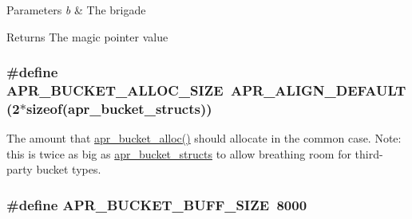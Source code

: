 \begin{DoxyParams}{Parameters}
{\em b} & The brigade \\
\hline
\end{DoxyParams}
\begin{DoxyReturn}{Returns}
The magic pointer value 
\end{DoxyReturn}
\hypertarget{group___a_p_r___util___bucket___brigades_gae3ccf4c383c9e7fea28354cc8e029626}{
\subsubsection[{A\-P\-R\-\_\-\-B\-U\-C\-K\-E\-T\-\_\-\-A\-L\-L\-O\-C\-\_\-\-S\-I\-Z\-E}]{\setlength{\rightskip}{0pt plus 5cm}\#define A\-P\-R\-\_\-\-B\-U\-C\-K\-E\-T\-\_\-\-A\-L\-L\-O\-C\-\_\-\-S\-I\-Z\-E~A\-P\-R\-\_\-\-A\-L\-I\-G\-N\-\_\-\-D\-E\-F\-A\-U\-L\-T(2$\ast$sizeof({\bf apr\-\_\-bucket\-\_\-structs}))}}\label{group___a_p_r___util___bucket___brigades_gae3ccf4c383c9e7fea28354cc8e029626}
The amount that \hyperlink{group___a_p_r___util___bucket___brigades_gae47c2235a3740432f4a0990fccfe4102}{apr\-\_\-bucket\-\_\-alloc()} should allocate in the common case. Note\-: this is twice as big as \hyperlink{unionapr__bucket__structs}{apr\-\_\-bucket\-\_\-structs} to allow breathing room for third-\/party bucket types. \hypertarget{group___a_p_r___util___bucket___brigades_ga82bf404af30875135c65e2c13ad035e5}{
\subsubsection[{A\-P\-R\-\_\-\-B\-U\-C\-K\-E\-T\-\_\-\-B\-U\-F\-F\-\_\-\-S\-I\-Z\-E}]{\setlength{\rightskip}{0pt plus 5cm}\#define A\-P\-R\-\_\-\-B\-U\-C\-K\-E\-T\-\_\-\-B\-U\-F\-F\-\_\-\-S\-I\-Z\-E~8000}}\label{group___a_p_r___util___bucket___brigades_ga82bf404af30875135c65e2c13ad035e5}
